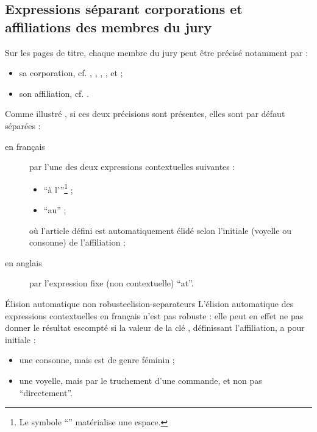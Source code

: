\subsection{Expressions séparant corporations et affiliations des membres du jury}
\label{sec-expr-separ-les}%
%

Sur les pages de titre, chaque membre du jury peut être précisé notamment par :
\begin{itemize}
\item sa corporation, cf. , ,
  , ,
   et  ;
\item son affiliation, cf. .
\end{itemize}
Comme illustré , si ces deux précisions sont présentes,
elles sont par défaut séparées :
\begin{description}
\item[en français] par l'une des deux expressions contextuelles suivantes :
  \begin{itemize}
  \item \enquote{\textvisiblespace{}à l'}\footnote{Le symbole
      \enquote{\textvisiblespace{}} matérialise une espace.} ;
  \item \enquote{\textvisiblespace{}au\textvisiblespace{}} ;
  \end{itemize}
  où l'article défini est automatiquement élidé selon l'initiale (voyelle ou
  consonne) de l'affiliation ;
\item[en anglais] par l'expression fixe (non contextuelle)
  \enquote{\textvisiblespace{}at\textvisiblespace{}}.
\end{description}

\begin{dbwarning}{Élision automatique non robuste}{elision-separateurs}
  L'élision automatique des expressions contextuelles en français n'est pas
  robuste : elle peut en effet ne pas donner le résultat escompté si la valeur
  de la clé , définissant l'affiliation, a pour initiale :
  \begin{itemize}
  \item une consonne, mais est de genre féminin ;
  \item une voyelle, mais par le truchement d'une commande\commandeacronyme, et
    non pas \enquote{directement}.
  \end{itemize}
\end{dbwarning}


